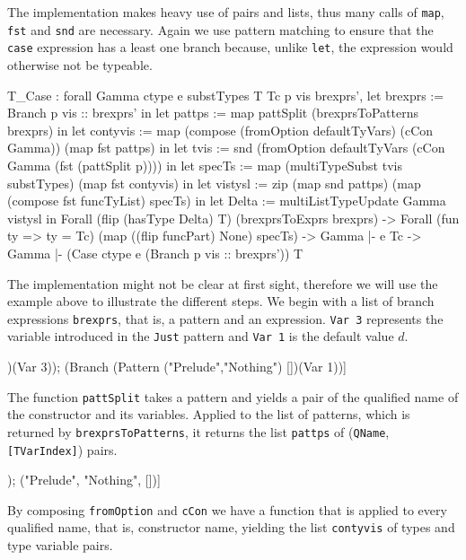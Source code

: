 \documentclass[fleqn]{scrreprt}
\newcommand{\todo}[1]{\marginpar{\textbf{TODO:} #1}}
\newcommand{\coqinline}[1]{\texttt{#1}}
\begin{document}
The implementation makes heavy use of pairs and lists, thus many calls of \coqinline{map}, \coqinline{fst} and \coqinline{snd} are necessary. Again we use pattern matching to ensure that the \texttt{case} expression has a least one branch because, unlike \texttt{let}, the expression would otherwise not be typeable.
\todo{CamelCase im Code}
\begin{coqcode}
T_Case : forall Gamma ctype e substTypes T Tc p vis brexprs',
           let  brexprs := Branch p vis :: brexprs' in
           let   pattps := map pattSplit (brexprsToPatterns brexprs) in
           let contyvis := map (compose (fromOption defaultTyVars) (cCon Gamma))
                               (map fst pattps) in
           let     tvis := snd (fromOption defaultTyVars (cCon Gamma (fst (pattSplit p)))) in
           let   specTs := map (multiTypeSubst tvis substTypes)
                               (map fst contyvis) in
           let  vistysl := zip (map snd pattps)
                               (map (compose fst funcTyList) specTs) in
           let    Delta := multiListTypeUpdate Gamma vistysl
            in Forall (flip (hasType Delta) T) (brexprsToExprs brexprs) ->
               Forall (fun ty => ty = Tc) (map ((flip funcPart) None) specTs) ->
               Gamma |- e \in Tc ->
         Gamma |- (Case ctype e (Branch p vis :: brexprs')) \in T
\end{coqcode}
The implementation might not be clear at first sight, therefore we will use the example above to illustrate the different steps. We begin with a list of branch expressions \texttt{brexprs}, that is, a pattern and an expression. \texttt{Var 3} represents the variable introduced in the \texttt{Just} pattern and \texttt{Var 1} is the default value $d$.
\begin{coqcode}
[(Branch (Pattern ("Prelude","Just")   [3])(Var 3));
 (Branch (Pattern ("Prelude","Nothing") [])(Var 1))]
\end{coqcode}
The function \coqinline{pattSplit} takes a pattern and yields a pair of the qualified name of the constructor and its variables. Applied to the list of patterns, which is returned by \coqinline{brexprsToPatterns}, it returns the list \texttt{pattps} of (\coqinline{QName}, \coqinline{[TVarIndex]}) pairs.
\begin{coqcode}
[("Prelude", "Just", [3]); ("Prelude", "Nothing", [])]
\end{coqcode}
By composing \coqinline{fromOption} and \coqinline{cCon} we have a function that is applied to every qualified name, that is, constructor name, yielding the list \texttt{contyvis} of types and type variable pairs.
\end{document}
